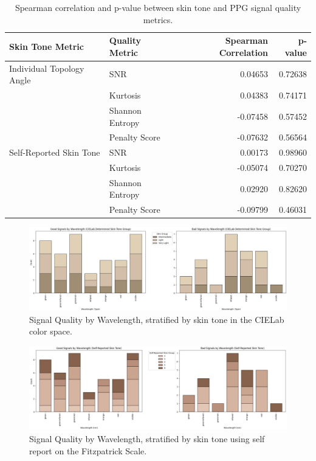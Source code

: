 \documentclass[letterpaper, 10 pt, conference]{ieeeconf}  %
\begin{document}
\begin{table}[t]
    \centering
    \begin{tabular}{p{4cm} p{3cm} r r}
    \toprule
    Skin Tone Metric & Quality Metric &  Spearman Correlation &  p-value \\
    \midrule
    Individual Topology Angle & SNR & 0.04653 & 0.72638 \\
     & Kurtosis & 0.04383 & 0.74171 \\
     & Shannon Entropy & -0.07458 & 0.57452 \\
     & Penalty Score & -0.07632 & 0.56564 \\
    Self-Reported Skin Tone & SNR & 0.00173 & 0.98960 \\
     & Kurtosis & -0.05074 & 0.70270 \\
     & Shannon Entropy & 0.02920 & 0.82620 \\
     & Penalty Score & -0.09799 & 0.46031 \\
    \bottomrule
    \end{tabular}
    
    \caption{Spearman correlation and p-value between skin tone and PPG signal quality metrics.}
    \label{fig:5}
\end{table}



\begin{figure}
    \centering
    \includegraphics[width=\linewidth]{images/cielab_hist.png}
    \caption{Signal Quality by Wavelength, stratified by skin tone in the CIELab color space.}
    \label{fig:cielab_hist}
\end{figure}
\begin{figure}
    \centering
    \includegraphics[width=\linewidth]{images/selfreport_hist.png}
    \caption{Signal Quality by Wavelength, stratified by skin tone using self report on the Fitzpatrick Scale.}
    \label{fig:selfreport_hist}
\end{figure}
\end{document}
